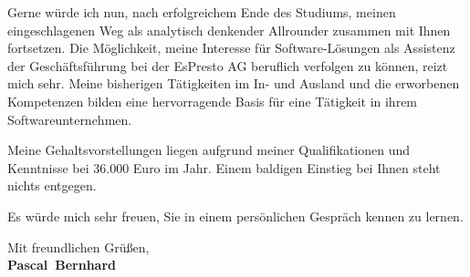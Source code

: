 \documentclass[11pt,a4paper]{article}
\def\firstname{Pascal}
\def\familyname{Bernhard}
\begin{document}
Gerne würde ich nun, nach erfolgreichem Ende des Studiums, meinen eingeschlagenen Weg als analytisch denkender Allrounder zusammen mit Ihnen fortsetzen.
Die Möglichkeit, meine Interesse für Software-Lösungen als Assistenz der Geschäftsführung bei der EsPresto AG beruflich verfolgen zu können, reizt mich sehr. Meine bisherigen Tätigkeiten im In- und Ausland und die erworbenen Kompetenzen bilden eine hervorragende Basis für eine Tätigkeit in ihrem Softwareunternehmen.


Meine Gehaltsvorstellungen liegen aufgrund meiner Qualifikationen und Kenntnisse bei 36.000 Euro im Jahr. Einem baldigen Einstieg bei Ihnen steht nichts entgegen.


Es würde mich sehr freuen, Sie in einem persönlichen Gespräch kennen zu lernen.

  
Mit freundlichen Grüßen,\\[3em] %
%
{\bfseries \firstname~\familyname}\\
%
\end{document}
